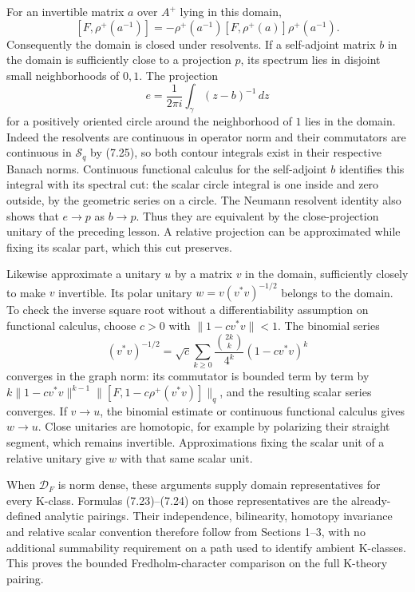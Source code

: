 \documentclass[
  11pt,
]{article}
\begin{document}
For an invertible matrix \(a\) over \(A^+\) lying in this domain, \[
 [F,\rho^+(a^{-1})]
     =-\rho^+(a^{-1})[F,\rho^+(a)]\rho^+(a^{-1}).
 \tag{7.25}
\] Consequently the domain is closed under resolvents. If a self-adjoint
matrix \(b\) in the domain is sufficiently close to a projection \(p\),
its spectrum lies in disjoint small neighborhoods of \(0,1\). The
projection \[
 e=\frac1{2\pi i}\int_\gamma(z-b)^{-1}\,dz
\] for a positively oriented circle around the neighborhood of \(1\)
lies in the domain. Indeed the resolvents are continuous in operator
norm and their commutators are continuous in \(\mathcal S_q\) by (7.25),
so both contour integrals exist in their respective Banach norms.
Continuous functional calculus for the self-adjoint \(b\) identifies
this integral with its spectral cut: the scalar circle integral is one
inside and zero outside, by the geometric series on a circle. The
Neumann resolvent identity also shows that \(e\to p\) as \(b\to p\).
Thus they are equivalent by the close-projection unitary of the
preceding lesson. A relative projection can be approximated while fixing
its scalar part, which this cut preserves.

Likewise approximate a unitary \(u\) by a matrix \(v\) in the domain,
sufficiently closely to make \(v\) invertible. Its polar unitary
\(w=v(v^*v)^{-1/2}\) belongs to the domain. To check the inverse square
root without a differentiability assumption on functional calculus,
choose \(c>0\) with \(\|1-cv^*v\|<1\). The binomial series \[
 (v^*v)^{-1/2}
    =\sqrt c\sum_{k\geq0}\frac{\binom{2k}{k}}{4^k}(1-cv^*v)^k
\] converges in the graph norm: its commutator is bounded term by term
by \(k\|1-cv^*v\|^{k-1}\|[F,1-c\rho^+(v^*v)]\|_q\), and the resulting
scalar series converges. If \(v\to u\), the binomial estimate or
continuous functional calculus gives \(w\to u\). Close unitaries are
homotopic, for example by polarizing their straight segment, which
remains invertible. Approximations fixing the scalar unit of a relative
unitary give \(w\) with that same scalar unit.

When \(\mathcal D_F\) is norm dense, these arguments supply domain
representatives for every K-class. Formulas (7.23)--(7.24) on those
representatives are the already-defined analytic pairings. Their
independence, bilinearity, homotopy invariance and relative scalar
convention therefore follow from Sections 1--3, with no additional
summability requirement on a path used to identify ambient K-classes.
This proves the bounded Fredholm-character comparison on the full
K-theory pairing.
\end{document}
